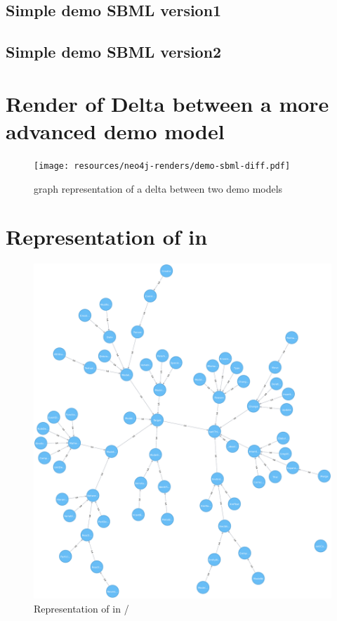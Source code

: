 \section{Simple demo SBML version1}
\label{sec:appendix:simple-demo:v1}


\section{Simple demo SBML version2}
\label{sec:appendix:simple-demo:v2}


\chapter{Render of Delta between a more advanced demo model}
\begin{figure}[h]
	\centering
	\texttt{[image: resources/neo4j-renders/demo-sbml-diff.pdf]}
	\caption{\neoj graph representation of a delta between two demo models}
	\label{fig:appendix:demo-sbml-diff}
\end{figure}

\chapter{Representation of \comodi in \masymos}
\begin{figure}[h]
	\centering
	\includegraphics[width=\textwidth,height=0.6\textheight,keepaspectratio]{resources/neo4j-renders/comodi.pdf}
	\caption{Representation of \comodi in \masymos/\neoj}
	\label{fig:appendix:neo4j-comodi}
\end{figure}